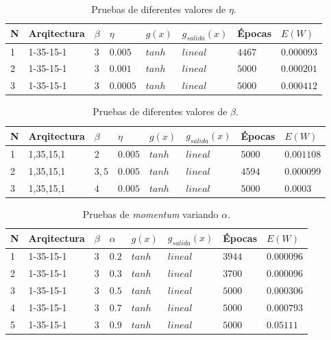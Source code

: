 \documentclass[11pt,a4paper]{article}
\begin{document}
{\begin{table}[ht]
\centering
\begin{tabular}{|l|l|l|l|l|l|l|l|}
\hline
N  & Arqitectura & $\beta$ & $\eta$   & $g(x)$ & $g_{salida}(x)$ & Épocas & $E(W)    $ \\ \hline
1  & 1-35-15-1    & $3$   & $0.005$ & $tanh$ & $lineal$      & $4467$   & $0.000093$ \\ \hline
2  & 1-35-15-1    & $3$    & $0.001$ & $tanh$ & $lineal$        & $5000$   & $0.000201$ \\ \hline
3  & 1-35-15-1    & $3$    & $0.0005$ & $tanh$  & $lineal$      & $5000$   & $0.000412$ \\ \hline
\end{tabular}
\caption{Pruebas de diferentes valores de $\eta$.}
\label{table:pruebaEta}
\end{table}

\begin{table}[ht]
\centering
\begin{tabular}{|l|l|l|l|l|l|l|l|}
\hline
N  & Arqitectura & $\beta$ & $\eta$   & $g(x)$ & $g_{salida}(x)$ & Épocas & $E(W)    $ \\ \hline
1 & 1,35,15,1 & $2$   & $0.005$  & $tanh$ & $lineal$ & $5000$ & $0.001108$ \\ \hline
2 & 1,35,15,1 & $3,5$ & $0.005$  & $tanh$ & $lineal$ & $4594$ & $0.000099$ \\ \hline
3 & 1,35,15,1 & $4$   & $0.005$ & $tanh$ & $lineal$ & $5000$ & $0.0003$   \\ \hline
\end{tabular}
\caption{Pruebas de diferentes valores de $\beta$.}
\label{table:pruebaBeta}
\end{table}




\begin{table}[ht]
\centering
\begin{tabular}{|l|l|l|l|l|l|l|l|}
\hline
N  & Arqitectura & $\beta$ & $\alpha$   & $g(x)$ & $g_{salida}(x)$ & Épocas & $E(W)$     \\ \hline
1  & 1-35-15-1    & $3$    & $0.2$ & $tanh$ & $lineal$      & $3944$   & $0.000096$ \\ \hline
2  & 1-35-15-1    & $3$    & $0.3$ & $tanh$ & $lineal$       & $3700$   & $0.000096$ \\ \hline
3  & 1-35-15-1    & $3$    & $0.5$ & $tanh$ & $lineal$         & $5000$   & 0.000306 \\ \hline
4  & 1-35-15-1    & $3$    & $0.7$ & $tanh$  & $lineal$       & $5000$   & $0.000793$ \\ \hline
5  & 1-35-15-1    & $3$    & $0.9$ & $tanh$  & $lineal$       & $5000$   & $0.05111$ \\ \hline
\end{tabular}
\caption{Pruebas de \emph{momentum} variando $\alpha$.}
\label{table:pruebaMomentum}
\end{table}

}
\end{document}
